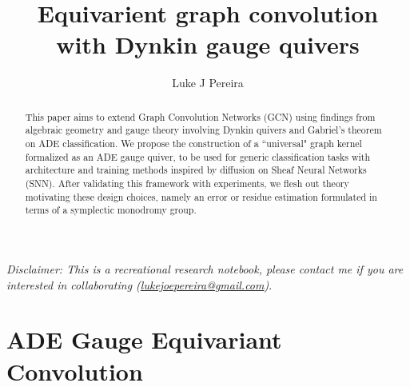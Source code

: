 \documentclass{article}
\title{\vspace{-3cm} Equivarient graph convolution \\with Dynkin gauge quivers  }
\author{Luke J Pereira}
\date{}
\theoremstyle{definition}
\begin{document}
\maketitle
\textit{
Disclaimer: This is a recreational research notebook, please contact me if you are interested in collaborating (\href{mailto:lukejoepereira@gmail.com}{lukejoepereira@gmail.com})}. \\
\begin{abstract}
\noindent
This paper aims to extend Graph Convolution Networks (GCN) using findings from algebraic geometry and gauge theory involving Dynkin quivers and Gabriel's theorem on ADE classification. We propose the construction of a ``universal" graph kernel formalized as an ADE gauge quiver, to be used for generic classification tasks with architecture and training methods inspired by diffusion on Sheaf Neural Networks (SNN). After validating this framework with experiments, we flesh out theory motivating these design choices, namely an error or residue estimation formulated in terms of a symplectic monodromy group. 

\end{abstract}
\tableofcontents
\newpage


\section{ADE Gauge Equivariant Convolution}
\end{document}
